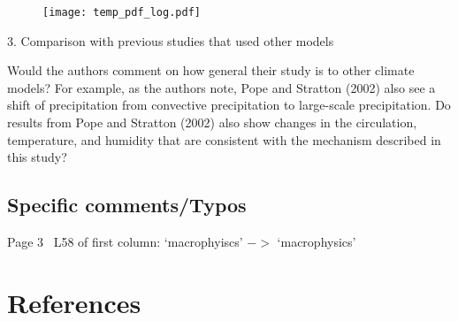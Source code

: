 \documentclass[12pt,oneside,a4paper]{article}%
\begin{document}
\begin{figure}[t]
\begin{center}
\noindent\texttt{[image: temp\_pdf\_log.pdf]}\\
\end{center}
\caption{\small {\color{red}{PDF of cloud base base mass fluxes (hPa/s) in the ZM scheme in an aqua-planet simulation. Red lines are the mass fluxes before the CFL limiter is applied, the red lines are after the limiter is applied.}}}
\label{fig:before-after}
\end{figure}

{\color{red}{Based on the reviewers comments, we've identified some erroneous statements in the original manuscript that have been removed or fixed. These were assertions that subsidence warming is stabilizing the atmosphere, when in fact it is subsidence drying and condensational heating that stabilize the atmosphere with resolution.}} \newline

3. Comparison with previous studies that used other models \newline

Would the authors comment on how general their study is to other climate models? For example, as the authors note, Pope and Stratton (2002) also see a shift of precipitation from convective precipitation to large-scale precipitation. Do results from Pope and Stratton (2002) also show changes in the circulation, temperature, and humidity that are consistent with the mechanism described in this study? \newline

{\color{red}{See General Remarks.}}

\subsection*{\small Specific comments/Typos}

Page 3 ~L58 of first column: ‘macrophyiscs’ $->$ ‘macrophysics’ \newline

{\color{red}{Fixed typo.}}

\section*{\normalsize References}
\setlength{\bibsep}{0pt}
{\footnotesize
}
\end{document}
